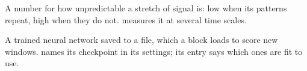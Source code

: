 \begin{glossarylist}
 A number for how unpredictable a stretch of signal
is: low when its patterns repeat, high when they do not. 
measures it at several time scales.

 A trained neural network saved to a file, which a block
loads to score new windows.  names its checkpoint in its
settings; its entry says which ones are fit to use.
\end{glossarylist}
